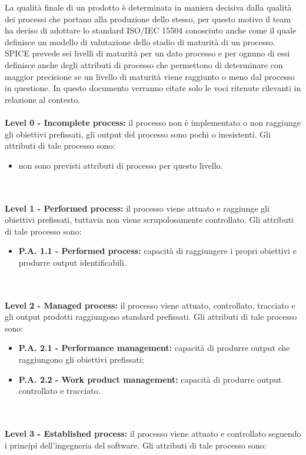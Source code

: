 La qualità finale di un prodotto è determinata in maniera decisiva dalla qualità dei processi che portano alla produzione dello stesso, per questo motivo il team ha deciso di adottare lo standard ISO/IEC 15504 conosciuto anche come  il quale definisce un modello di valutazione dello stadio di maturità di un processo. SPICE prevede sei livelli di maturità per un dato processo e per ognuno di essi definisce anche degli attributi di processo che permettono di determinare con maggior precisione se un livello di maturità viene raggiunto o meno dal processo in questione. In questo documento verranno citate solo le voci ritenute rilevanti in relazione al contesto.
\\\\
\textbf{Level 0 - Incomplete process:} il processo non è implementato o non raggiunge gli obiettivi prefissati, gli output del processo sono pochi o inesistenti. Gli attributi di tale processo sono:
\begin{itemize}
    \item non sono previsti attributi di processo per questo livello.
\end{itemize}
\\\\
\textbf{Level 1 - Performed process:} il processo viene attuato e raggiunge gli obiettivi prefissati, tuttavia non viene scrupolosamente controllato. Gli attributi di tale processo sono: 
\begin{itemize}
    \item \textbf{P.A. 1.1 - Performed process:} capacità di raggiungere i propri obiettivi e produrre output identificabili.
\end{itemize}
\\\\
\textbf{Level 2 - Managed process:} il processo viene attuato, controllato, tracciato e gli output prodotti raggiungono standard prefissati. Gli attributi di tale processo sono:
\begin{itemize}
    \item \textbf{P.A. 2.1 - Performance management:} capacità di produrre output che raggiungono gli obiettivi prefissati;
    \item \textbf{P.A. 2.2 - Work product management:} capacità di produrre output controllato e tracciato.
\end{itemize}
\\\\
\textbf{Level 3 - Established process:} il processo viene attuato e controllato seguendo i principi dell'ingegneria del software. Gli attributi di tale processo sono:
